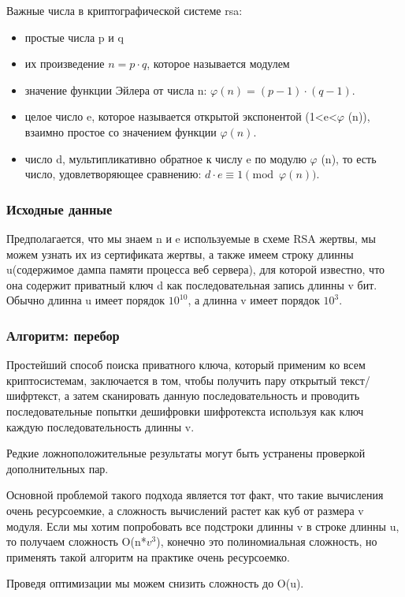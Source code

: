 \documentclass[20pt]{article}
\begin{document}
Важные числа в криптографической системе rsa:
\begin{itemize}
  \item простые числа p и q
  \item их произведение $n=p \cdot q$, которое называется модулем
  \item значение функции Эйлера от числа n: $\varphi (n)=(p-1)\cdot (q-1)$.
  \item целое число e, которое называется открытой экспонентой
    (1<e<$\varphi$ (n)), взаимно простое со значением функции $\varphi(n)$.
  \item число d, мультипликативно обратное к числу e по модулю
    $\varphi$ (n), то есть число, удовлетворяющее сравнению: $d\cdot e\equiv 1{\pmod {\varphi (n)}}$.
\end{itemize}

\subsubsection{Исходные данные}
Предполагается, что мы знаем n и e используемые в схеме RSA жертвы, мы можем
узнать их из сертификата жертвы, а также имеем строку длинны u(содержимое дампа
памяти процесса веб сервера), для которой известно, что она содержит приватный
ключ d как последовательная запись длинны v бит. Обычно длинна u имеет порядок
$10^10$, а длинна v имеет порядок $10^3$.

\subsubsection{Алгоритм: перебор}
Простейший способ поиска приватного ключа, который применим ко всем
криптосистемам, заключается в том, чтобы получить пару открытый текст/шифртекст,
а затем сканировать данную последовательность и проводить последовательные попытки
дешифровки шифротекста используя как ключ каждую последовательность длинны v.

Редкие ложноположительные результаты могут быть устранены проверкой
дополнительных пар.

Основной проблемой такого подхода является тот факт, что такие вычисления очень
ресурсоемкие, а сложность вычислений растет как куб от размера v модуля. Если мы
хотим попробовать все подстроки длинны v в строке длинны u, то получаем сложность
O(n*$v^3$), конечно это полиномиальная сложность, но применять такой алгоритм
на практике очень ресурсоемко.

Проведя оптимизации мы можем снизить сложность до O(u).
\end{document}
